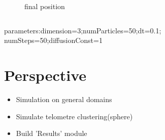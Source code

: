 \documentclass {beamer}
\begin{document}
\begin{frame}
\begin{columns}
\begin{column}{0.3\textwidth}
\begin{figure}
		\caption{final position}
		\end{figure}		
		\end{column}
		\end{columns}
		parameters:dimension=3;numParticles=50;dt=0.1;\\numSteps=50;diffusionConst=1
		\end{frame}
\section{Perspective}		 
		 \begin{frame}
		 \begin{itemize}
		 \item Simulation on general domains
		 \item Simulate telometre clustering(sphere)
		 \item Build 'Results' module
		 \end{itemize}
		 \end{frame}
\end{document}
